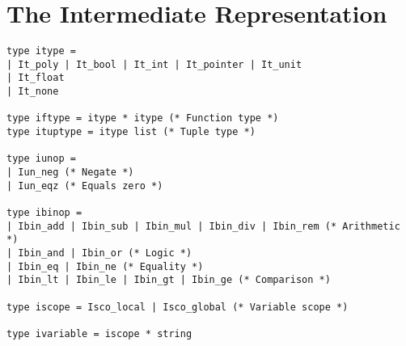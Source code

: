 \chapter{The Intermediate Representation}

\begin{verbatim}
type itype =
| It_poly | It_bool | It_int | It_pointer | It_unit
| It_float
| It_none

type iftype = itype * itype (* Function type *)
type ituptype = itype list (* Tuple type *)

type iunop =
| Iun_neg (* Negate *)
| Iun_eqz (* Equals zero *)

type ibinop =
| Ibin_add | Ibin_sub | Ibin_mul | Ibin_div | Ibin_rem (* Arithmetic *)
| Ibin_and | Ibin_or (* Logic *)
| Ibin_eq | Ibin_ne (* Equality *)
| Ibin_lt | Ibin_le | Ibin_gt | Ibin_ge (* Comparison *)

type iscope = Isco_local | Isco_global (* Variable scope *)

type ivariable = iscope * string


\end{verbatim}
